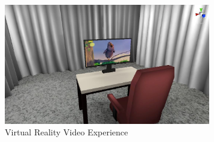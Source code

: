 \begin{figure}[h]
    \centering
    \includegraphics[width=0.8\textwidth]{./images/fig4.jpeg}
    \caption{Virtual Reality Video Experience}
    \label{fig:fig4}
\end{figure}
